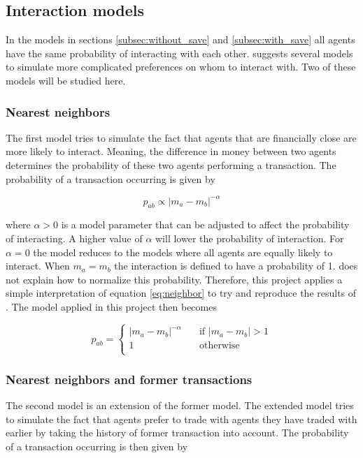 \documentclass{article}
\begin{document}
\subsection{Interaction models}
\label{subsec:interact}

In the models in sections \ref{subsec:without_save} and \ref{subsec:with_save} all agents have the same probability of interacting with each other. \cite{interaction} suggests several models to simulate more complicated preferences on whom to interact with. Two of these models will be studied here. 

\subsubsection{Nearest neighbors}
\label{subsec:neighbors}

The first model tries to simulate the fact that agents that are financially close are more likely to interact. Meaning, the difference in money between two agents determines the probability of these two agents performing a transaction. The probability of a transaction occurring is given by

\begin{equation}
p_{ab} \propto |m_a - m_b|^{-\alpha}
\label{eq:neighbor}
\end{equation}

\noindent where $\alpha > 0$ is a model parameter that can be adjusted to affect the probability of interacting. A higher value of $\alpha$ will lower the probability of interaction. For $\alpha=0$ the model reduces to the models where all agents are equally likely to interact. When $m_a = m_b$ the interaction is defined to have a probability of 1. \cite{interaction} does not explain how to normalize this probability. Therefore, this project applies a simple interpretation of equation \ref{eq:neighbor} to try and reproduce the results of \cite{interaction}. The model applied in this project then becomes 

\begin{equation}
p_{ab} = 
\begin{cases}
|m_a - m_b|^{-\alpha} &   \quad      \text{if } |m_a - m_b| > 1     \\
1                     &   \quad      \text{otherwise }  \\
\end{cases}
\end{equation}

\subsubsection{Nearest neighbors and former transactions}
\label{subsec:history}
The second model is an extension of the former model. The extended model tries to simulate the fact that agents prefer to trade with agents they have traded with earlier by taking the history of former transaction into account. The probability of a transaction occurring is then given by
\end{document}
